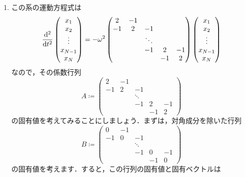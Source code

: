 \documentclass[a4paper,pdflatex,ja=standard]{bxjsarticle}
\begin{document}
\begin{enumerate}
  \item   
  この系の運動方程式は
  \begin{equation}
    \dv[2]{}{t}
    \begin{pmatrix}
      x_1 \\
      x_2 \\
      \vdots \\
      x_{N-1} \\
      x_N
    \end{pmatrix}
    =
    -\omega^2
    \begin{pmatrix}
      2 & -1 &      &   &   \\
     -1 &  2 & -1   &   &   \\
        &    &\ddots&   &   \\
        &    &   -1 & 2 & -1\\
        &    &      & -1& 2  
   \end{pmatrix}
    \begin{pmatrix}
      x_1 \\
      x_2 \\
      \vdots \\
      x_{N-1} \\
      x_N
    \end{pmatrix}
  \end{equation}
  なので，その係数行列
  \begin{equation}
    A
    \coloneqq
    \begin{pmatrix}
      2 & -1 &      &   &   \\
     -1 &  2 & -1   &   &   \\
        &    &\ddots&   &   \\
        &    &   -1 & 2 & -1\\
        &    &      & -1& 2  
   \end{pmatrix}
  \end{equation}
  の固有値を考えてみることにしましょう．まずは，対角成分を除いた行列
  \begin{equation}
    B
    \coloneqq
    \begin{pmatrix}
      0 & -1 &      &   &   \\
     -1 &  0 & -1   &   &   \\
        &    &\ddots&   &   \\
        &    &   -1 & 0 & -1\\
        &    &      & -1& 0  
   \end{pmatrix}
  \end{equation}
  の固有値を考えます．すると，この行列の固有値と固有ベクトルは

\end{enumerate}
\end{document}
